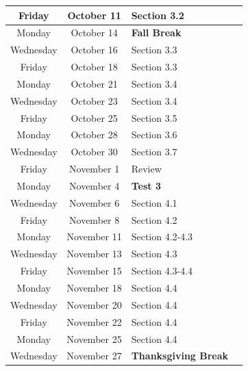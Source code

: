\documentclass[12pt]{article}
\begin{document}
\begin{center}
\begin{tabular}{|c|c|l|l|}
\hline
Friday & October 11 & Section 3.2\\

\hline
Monday & October 14 & \textbf{Fall Break}\\

\hline
Wednesday & October 16 & Section 3.3\\

\hline
Friday & October 18 & Section 3.3 \\

\hline
Monday & October 21 & Section 3.4\\

\hline
Wednesday & October 23 & Section 3.4\\

\hline
Friday & October 25 & Section 3.5 \\

\hline
Monday & October 28 & Section 3.6\\

\hline
Wednesday & October 30 & Section 3.7\\

\hline
Friday & November 1 & Review \\

\hline
Monday & November 4 & \textbf{Test 3}\\

\hline
Wednesday & November 6 & Section 4.1\\

\hline
Friday & November 8 & Section 4.2 \\

\hline
Monday & November 11 & Section 4.2-4.3 \\

\hline
Wednesday & November 13 & Section 4.3\\

\hline
Friday & November 15 & Section 4.3-4.4 \\

\hline
Monday & November 18 & Section 4.4 \\

\hline
Wednesday & November 20 & Section 4.4\\

\hline
Friday & November 22 & Section 4.4\\

\hline
Monday & November 25 & Section 4.4\\

\hline
Wednesday & November 27 & \textbf{Thanksgiving Break}\\


\end{tabular}
\end{center}
\end{document}
